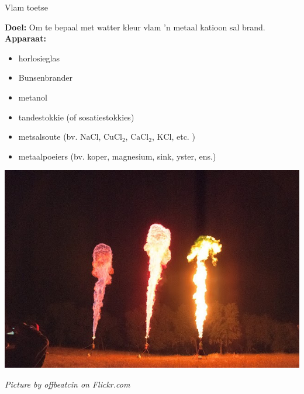 
\nopagebreak
\begin{i_experiment}{Vlam toetse}{
            \nopagebreak
            \label{m38741*eip-699}\noindent{}\textbf{Doel:}\newline
Om te bepaal met watter kleur vlam  'n metaal katioon sal brand. \\
\label{m38741*eip-6991}\noindent{}\textbf{Apparaat:}\newline
\begin{minipage}{.5\textwidth}
\begin{itemize}[noitemsep]
\item horlosieglas
\item Bunsenbrander
\item metanol
\item tandestokkie (of sosatiestokkies)
\item metsalsoute (bv. $\text{NaCl}$, ${\text{CuCl}}_{2}$, ${\text{CaCl}}_{2}$, $\text{KCl}$, etc. )
\item metaalpoeiers (bv. koper, magnesium, sink, yster, ens.)
\end{itemize}
\end{minipage}
\begin{minipage}{.5\textwidth}
\begin{center}
 \includegraphics[width=.8\textwidth]{photos/offbeatcin.jpg}\par
\textit{Picture by offbeatcin on Flickr.com}
\end{center}
\end{minipage}
}
\end{i_experiment}
